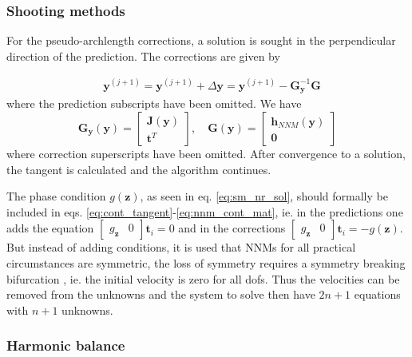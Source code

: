 \subsubsection{Shooting methods}
\label{sec:shooting_cont}

For the pseudo-archlength corrections, a solution is sought in the perpendicular
direction of the prediction. The corrections are given by

\begin{equation}
  \label{eq:nnm_cont_corr}
  \begin{aligned}
    &\bm y^{(j+1)} = \bm y^{(j+1)} + \Delta \bm y =
    \bm y^{(j+1)} -\bm G^{-1}_{\bm y} \bm G
  \end{aligned}
\end{equation}
where the prediction subscripts have been omitted. We have
\begin{equation}
  \label{eq:nnm_cont_mat}
    \bm G_{\bm y}(\bm y) =
    \begin{bmatrix}
      \bm J(\bm y) \\ \bm t^T
    \end{bmatrix}, \quad
    \bm G(\bm y) =
      \begin{bmatrix}
      \bm h_{NNM}(\bm y) \\ \bm 0
    \end{bmatrix}
  \end{equation}
where correction superscripts have been omitted. After convergence to a
solution, the tangent is calculated and the algorithm continues.

The phase condition $g(\bm z)$, as seen in eq. \eqref{eq:sm_nr_sol}, should
formally be included in eqs. \eqref{eq:cont_tangent}-\eqref{eq:nnm_cont_mat},
ie. in the predictions one adds the equation $ \begin{bmatrix}g_{\bm z} &
  0 \end{bmatrix} \bm t_i = 0 $ and in the corrections $ \begin{bmatrix}g_{\bm
    z} & 0 \end{bmatrix} \bm t_i = - g(\bm z) $. But instead of adding
conditions, it is used that NNMs for all practical circumstances are symmetric,
the loss of symmetry requires a symmetry breaking bifurcation
\autocite{kerschen2009b}, ie. the initial velocity is zero for all dofs. Thus
the velocities can be removed from the unknowns and the system to solve then
have $2n+1$ equations with $n+1$ unknowns.


\subsubsection{Harmonic balance}
\label{sec:hb_cont}

